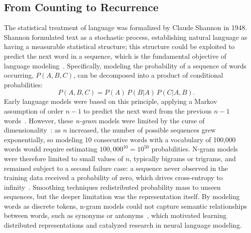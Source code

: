 \subsection{From Counting to Recurrence}\label{sec:ch1-lm-pretransformer}
The statistical treatment of language was formalized by Claude Shannon in 1948. Shannon formulated text as a stochastic process, establishing natural language as having a measurable statistical structure; this structure could be exploited to predict the next word in a sequence, which is the fundamental objective of language modeling~\cite{shannon1948mathematical}.
Specifically, modeling the probability of a sequence of words occurring, $P(A,B,C)$, can be decomposed into a product of conditional probabilities:
\begin{equation}
    P(A,B,C) = P(A)\,P(B|A)\,P(C|A,B).
\end{equation}
Early language models were based on this principle, applying a Markov assumption of order $n-1$ to predict the next word from the previous $n-1$ words~\cite{chen1999empirical}. However, these \textit{n-gram} models were limited by the curse of dimensionality~\cite{bengio2003neural}: as $n$ increased, the number of possible sequences grew exponentially, so modeling 10 consecutive words with a vocabulary of 100,000 words would require estimating $100{,}000^{10} = 10^{50}$ probabilities. N-gram models were therefore limited to small values of $n$, typically bigrams or trigrams, and remained subject to a second failure case: a sequence never observed in the training data received a probability of zero, which drives cross-entropy to infinity~\cite{chen1999empirical}. Smoothing techniques redistributed probability mass to unseen sequences, but the deeper limitation was the representation itself. By modeling words as discrete tokens, n-gram models could not capture semantic relationships between words, such as synonyms or antonyms~\cite{bengio2003neural}, which motivated learning distributed representations and catalyzed research in neural language modeling.

